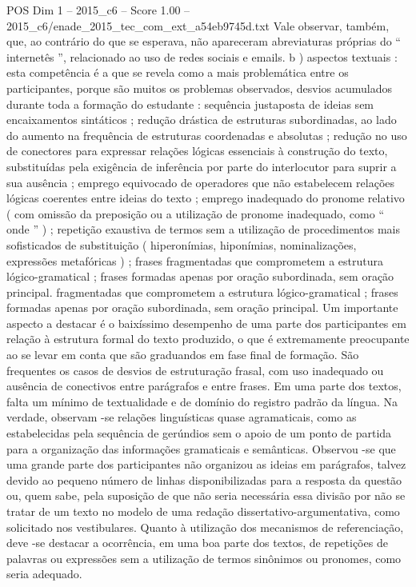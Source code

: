 \begin{textsample}{POS Dim 1 – 2015\_c6 – Score 1.00 – 2015\_c6/enade\_2015\_tec\_com\_ext\_a54eb9745d.txt}
Vale observar, também, que, ao contrário do que se esperava, não apareceram abreviaturas próprias do “ internetês ”, relacionado ao uso de redes sociais e emails. b ) aspectos textuais : esta competência é a que se revela como a mais problemática entre os participantes, porque são muitos os problemas observados, desvios acumulados durante toda a formação do estudante : sequência justaposta de ideias sem encaixamentos sintáticos ; redução drástica de estruturas subordinadas, ao lado do aumento na frequência de estruturas coordenadas e absolutas ; redução no uso de conectores para expressar relações lógicas essenciais à construção do texto, substituídas pela exigência de inferência por parte do interlocutor para suprir a sua ausência ; emprego equivocado de operadores que não estabelecem relações lógicas coerentes entre ideias do texto ; emprego inadequado do pronome relativo ( com omissão da preposição ou a utilização de pronome inadequado, como “ onde ” ) ; repetição exaustiva de termos sem a utilização de procedimentos mais sofisticados de substituição ( hiperonímias, hiponímias, nominalizações, expressões metafóricas ) ; frases fragmentadas que comprometem a estrutura lógico-gramatical ; frases formadas apenas por oração subordinada, sem oração principal. fragmentadas que comprometem a estrutura lógico-gramatical ; frases formadas apenas por oração subordinada, sem oração principal.
Um importante aspecto a destacar é o baixíssimo desempenho de uma parte dos participantes em relação à estrutura formal do texto produzido, o que é extremamente preocupante ao se levar em conta que são graduandos em fase final de formação.
São frequentes os casos de desvios de estruturação frasal, com uso inadequado ou ausência de conectivos entre parágrafos e entre frases.
Em uma parte dos textos, falta um mínimo de textualidade e de domínio do registro padrão da língua.
Na verdade, observam -se relações linguísticas quase agramaticais, como as estabelecidas pela sequência de gerúndios sem o apoio de um ponto de partida para a organização das informações gramaticais e semânticas.
Observou -se que uma grande parte dos participantes não organizou as ideias em parágrafos, talvez devido ao pequeno número de linhas disponibilizadas para a resposta da questão ou, quem sabe, pela suposição de que não seria necessária essa divisão por não se tratar de um texto no modelo de uma redação dissertativo-argumentativa, como solicitado nos vestibulares.
Quanto à utilização dos mecanismos de referenciação, deve -se destacar a ocorrência, em uma boa parte dos textos, de repetições de palavras ou expressões sem a utilização de termos sinônimos ou pronomes, como seria adequado.

\end{textsample}
